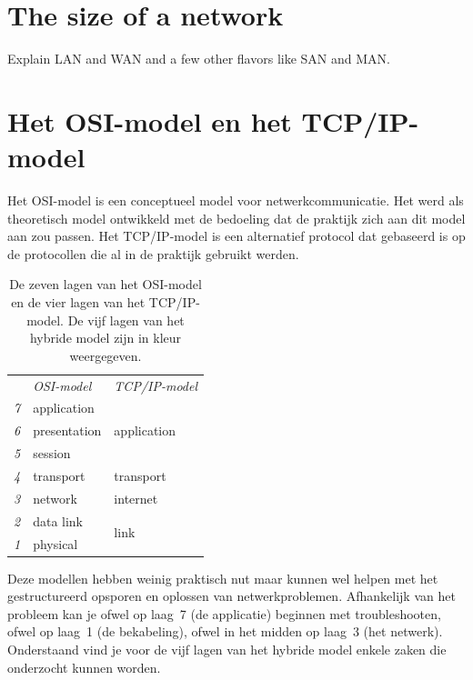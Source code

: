 \section{The size of a network}

Explain LAN and WAN and a few other flavors like SAN and MAN.



\section{Het OSI-model en het TCP/IP-model}

Het OSI-model is een conceptueel model voor netwerkcommunicatie.
Het werd als theoretisch model ontwikkeld met de bedoeling dat de praktijk zich aan dit model aan zou passen.
Het TCP/IP-model is een alternatief protocol dat gebaseerd is op de protocollen die al in de praktijk gebruikt werden.

\begin{table}[htp]
   \centering
   \begin{tabular}{rll}
     & \textit{OSI-model} & \textit{TCP/IP-model} \\[1ex]
   \textit{7} & application & \multirow{3}{*}{\textcolor{spot1}{application}} \\
   \textit{6} & presentation & \\
   \textit{5} & session & \\[1ex]
   \textit{4} & \textcolor{spot1}{transport} & transport \\[1ex]
   \textit{3} & \textcolor{spot1}{network} & internet \\[1ex]
   \textit{2} & \textcolor{spot1}{data link} & \multirow{2}{*}{link} \\
   \textit{1} & \textcolor{spot1}{physical} & \\
   \end{tabular}
   \caption{De zeven lagen van het OSI-model en de vier lagen van het TCP/IP-model.
   De vijf lagen van het hybride model zijn in kleur weergegeven.}
   \label{tab:osi-model}
\end{table}

Deze modellen hebben weinig praktisch nut maar kunnen wel helpen met het gestructureerd opsporen en oplossen van netwerkproblemen.
Afhankelijk van het probleem kan je ofwel op laag~7 (de applicatie) beginnen met troubleshooten, ofwel op laag~1 (de bekabeling), ofwel in het midden op laag~3 (het netwerk).
Onderstaand vind je voor de vijf lagen van het hybride model enkele zaken die onderzocht kunnen worden.


